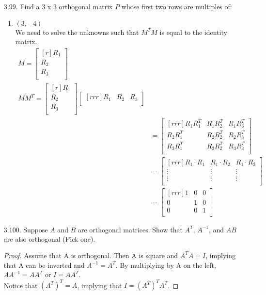 \documentclass[12pt]{article}
\begin{document}
\begin{enumerate}
\item [3.99.] Find a 3 x 3 orthogonal matrix $P$ whose first two rows are multiples of:
	\begin{enumerate}
	\item $(3, -4)$\\
	We need to solve the unknowns such that $M^TM$ is equal to the identity matrix.
	\begin{align*}
	M= \begin{bmatrix}[r] R_1\\ R_2\\ R_3\\ \end{bmatrix}\\
	MM^T = \begin{bmatrix}[r] R_1\\ R_2\\ R_3\\ \end{bmatrix}
	\begin{bmatrix}[rrr] R_1 & R_2 & R_3\\ \end{bmatrix}\\
	&=
	\begin{bmatrix}[rrr]
	R_1R_1^T & R_1R_2^T & R_1R_3^T\\
	R_2R_1^T & R_2R_2^T & R_2R_3^T\\
	R_3R_1^T & R_3R_2^T & R_3R_3^T\\
	\end{bmatrix}\\
	&=
	\begin{bmatrix}[rrr]
	R_1 \cdot R_1 & R_1 \cdot R_2 & R_1 \cdot R_3\\
	\vdots & \vdots & \vdots\\
	\vdots & \vdots & \vdots\\
	\end{bmatrix}\\
	&=
	\begin{bmatrix}[rrr]
	1 & 0 & 0\\
	0 & 1 & 0\\
	0 & 0 & 1\\
	\end{bmatrix}
	\end{align*}
	\end{enumerate}


\item [3.100.] Suppose $A$ and $B$ are orthogonal matrices. Show that $A^T$, $A^{-1}$, and $AB$ are also orthogonal (Pick one).\\
\begin{proof}
Assume that A is orthogonal. Then A is square and $A^TA=I$, implying that A can be inverted and $A^{-1}=A^T$. By multiplying by A on the left, $AA^{-1} = AA^T$ or $I=AA^T$.\\
Notice that $(A^T)^T = A$, implying that $I=(A^T)^TA^T$.
\end{proof}

\end{enumerate}
\end{document}
